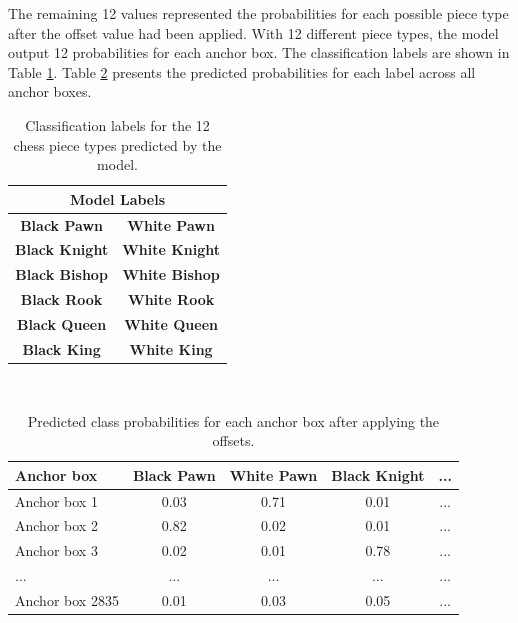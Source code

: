 The remaining 12 values represented the probabilities for each possible piece type after the offset value had been applied. With 12 different piece types, the model output 12 probabilities for each anchor box. The classification labels are shown in Table \ref{tab:piece-label-table}. Table \ref{tab:piece-probability-table} presents the predicted probabilities for each label across all anchor boxes. \\

\begin{table}[ht]
\centering
\caption{Classification labels for the 12 chess piece types predicted by the model.}
\begin{tabular}{|c|c|}
\hline
\multicolumn{2}{|c|}{\textbf{Model Labels}} \\  %
\hline
\textbf{Black Pawn} & \textbf{White Pawn} \\
\textbf{Black Knight} & \textbf{White Knight} \\
\textbf{Black Bishop} & \textbf{White Bishop} \\
\textbf{Black Rook} & \textbf{White Rook} \\
\textbf{Black Queen} & \textbf{White Queen} \\
\textbf{Black King} & \textbf{White King} \\
\hline
\end{tabular}
\label{tab:piece-label-table}
\end{table} 

\\


\begin{table}[h]
    \centering
    \caption{Predicted class probabilities for each anchor box after applying the offsets.}  %
    \renewcommand{\arraystretch}{1.5} %
    \begin{tabular}{lcccc}
        \toprule
        \textbf{Anchor box} & \textbf{Black Pawn} & \textbf{White Pawn} & \textbf{Black Knight} & \textbf{...} \\
        \midrule
        Anchor box 1 & \raggedright 0.03 & \raggedright 0.71 & \raggedright 0.01 & ... \\
        Anchor box 2 & \raggedright 0.82 & \raggedright 0.02 & \raggedright 0.01 & ... \\
        Anchor box 3 & \raggedright 0.02 & \raggedright 0.01 & \raggedright 0.78 & ... \\
        ... & ... & ... & ... & ... \\
        Anchor box 2835 & \raggedright 0.01 & \raggedright 0.03 & \raggedright 0.05 & ... \\
        \bottomrule
    \end{tabular}
    \label{tab:piece-probability-table}
\end{table}

